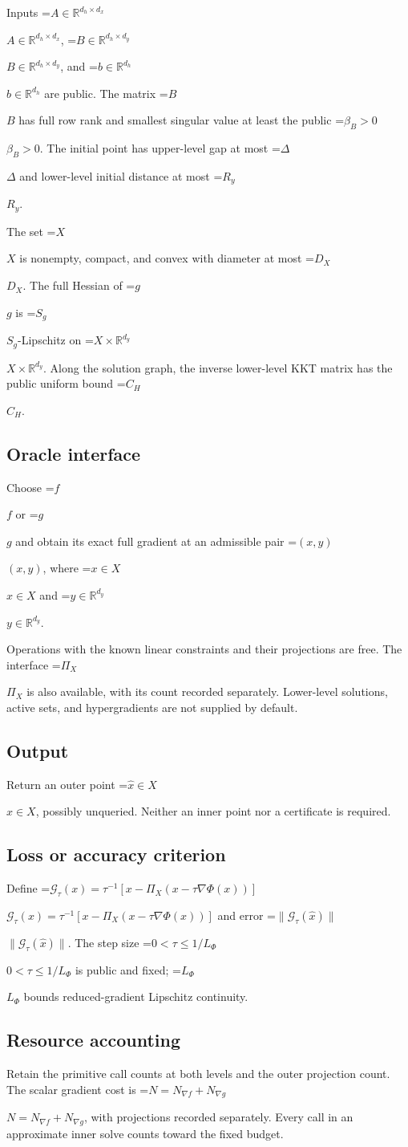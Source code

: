 \documentclass[10pt,a4paper]{article}
\newcommand{\AtlasMath}[1]{\par\begingroup\centering\setbox0=\hbox{$\displaystyle #1$}\ifdim\wd0>1.4\linewidth\typeout{ATLAS WIDE FORMULA: \the\wd0}\fi\ifdim\wd0>\linewidth\resizebox{\linewidth}{!}{\box0}\else\box0\fi\par\endgroup}
\newcommand{\AtlasInlineMath}[1]{\begingroup\setbox0=\hbox{$#1$}\ifdim\wd0>.4\linewidth\endgroup\AtlasMath{#1}\else\endgroup$#1$\fi}
\begin{document}
Inputs \AtlasInlineMath{A\in\mathbb{R}^{d_h\times d_x}}, \AtlasInlineMath{B\in\mathbb{R}^{d_h\times d_y}}, and \AtlasInlineMath{b\in\mathbb{R}^{d_h}} are public. The matrix \AtlasInlineMath{B} has full row rank and smallest singular value at least the public \AtlasInlineMath{\beta_B>0}. The initial point has upper-level gap at most \AtlasInlineMath{\Delta} and lower-level initial distance at most \AtlasInlineMath{R_y}.

The set \AtlasInlineMath{X} is nonempty, compact, and convex with diameter at most \AtlasInlineMath{D_X}. The full Hessian of \AtlasInlineMath{g} is \AtlasInlineMath{S_g}-Lipschitz on \AtlasInlineMath{X\times\mathbb{R}^{d_y}}. Along the solution graph, the inverse lower-level KKT matrix has the public uniform bound \AtlasInlineMath{C_H}.

\subsection{Oracle interface}
Choose \AtlasInlineMath{f} or \AtlasInlineMath{g} and obtain its exact full gradient at an admissible pair \AtlasInlineMath{(x,y)}, where \AtlasInlineMath{x\in X} and \AtlasInlineMath{y\in\mathbb R^{d_y}}.

Operations with the known linear constraints and their projections are free. The interface \AtlasInlineMath{\Pi_X} is also available, with its count recorded separately. Lower-level solutions, active sets, and hypergradients are not supplied by default.

\subsection{Output}
Return an outer point \AtlasInlineMath{\widehat{x}\in X}, possibly unqueried. Neither an inner point nor a certificate is required.

\subsection{Loss or accuracy criterion}
Define \AtlasInlineMath{\mathcal{G}_\tau(x)=\tau^{-1}[x-\Pi_X(x-\tau\nabla\Phi(x))]} and error \AtlasInlineMath{\|\mathcal{G}_\tau(\widehat{x})\|}. The step size \AtlasInlineMath{0<\tau\le1/L_\Phi} is public and fixed; \AtlasInlineMath{L_\Phi} bounds reduced-gradient Lipschitz continuity.

\subsection{Resource accounting}
Retain the primitive call counts at both levels and the outer projection count. The scalar gradient cost is \AtlasInlineMath{N=N_{\nabla f}+N_{\nabla g}}, with projections recorded separately. Every call in an approximate inner solve counts toward the fixed budget.
\end{document}
